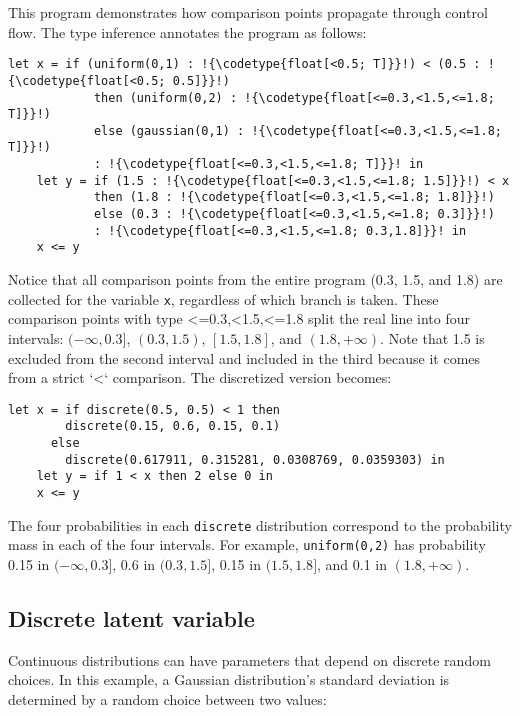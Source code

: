 \documentclass[acmsmall,screen,dvipsnames,x11names,nonacm,anonymous,review]{acmart}
\newcommand{\codetype}[1]{\textcolor{typecolor}{\ttfamily\small#1}}
\begin{document}
\noindent This program demonstrates how comparison points propagate through control flow. The type inference annotates the program as follows:

\begin{lstlisting}[aboveskip=1em,belowskip=1em,escapechar=!]
    let x = if (uniform(0,1) : !{\codetype{float[<0.5; T]}}!) < (0.5 : !{\codetype{float[<0.5; 0.5]}}!)
            then (uniform(0,2) : !{\codetype{float[<=0.3,<1.5,<=1.8; T]}}!)
            else (gaussian(0,1) : !{\codetype{float[<=0.3,<1.5,<=1.8; T]}}!)
            : !{\codetype{float[<=0.3,<1.5,<=1.8; T]}}! in
    let y = if (1.5 : !{\codetype{float[<=0.3,<1.5,<=1.8; 1.5]}}!) < x
            then (1.8 : !{\codetype{float[<=0.3,<1.5,<=1.8; 1.8]}}!)
            else (0.3 : !{\codetype{float[<=0.3,<1.5,<=1.8; 0.3]}}!)
            : !{\codetype{float[<=0.3,<1.5,<=1.8; 0.3,1.8]}}! in
    x <= y
\end{lstlisting}

\noindent Notice that all comparison points from the entire program (0.3, 1.5, and 1.8) are collected for the variable \texttt{x}, regardless of which branch is taken. These comparison points with type \codetype{<=0.3,<1.5,<=1.8} split the real line into four intervals: $(-\infty, 0.3]$, $(0.3, 1.5)$, $[1.5, 1.8]$, and $(1.8, +\infty)$. Note that 1.5 is excluded from the second interval and included in the third because it comes from a strict `<` comparison. The discretized version becomes:

\begin{lstlisting}[aboveskip=1em,belowskip=1em]
    let x = if discrete(0.5, 0.5) < 1 then
        discrete(0.15, 0.6, 0.15, 0.1)
      else
        discrete(0.617911, 0.315281, 0.0308769, 0.0359303) in
    let y = if 1 < x then 2 else 0 in
    x <= y
\end{lstlisting}

\noindent The four probabilities in each \texttt{discrete} distribution correspond to the probability mass in each of the four intervals. For example, \texttt{uniform(0,2)} has probability 0.15 in $(-\infty, 0.3]$, 0.6 in $(0.3, 1.5]$, 0.15 in $(1.5, 1.8]$, and 0.1 in $(1.8, +\infty)$.

\subsection{Discrete latent variable}

Continuous distributions can have parameters that depend on discrete random choices. In this example, a Gaussian distribution's standard deviation is determined by a random choice between two values:
\end{document}
